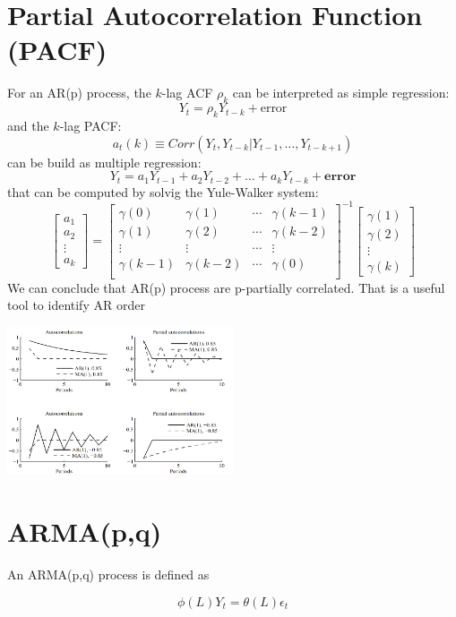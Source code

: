 \section{Partial Autocorrelation Function (PACF)}
For an AR(p) process, the $k$-lag ACF $\rho_k$ can be interpreted as simple regression:
\[
Y_t = \rho_k Y_{t-k} + \text{error}
\]
and the $k$-lag PACF:
\[
a_t(k) \equiv Corr(Y_t, Y_{t-k} | Y_{t-1}, \ldots, Y_{t-k+1})
\]
can be build as multiple regression:
\[
Y_t = a_1 Y_{t-1} + a_2 Y_{t-2} + \ldots + a_kY_{t-k} + \textbf{error}
\]
that can be computed by solvig the Yule-Walker system:
\begin{equation*}
	\begin{bmatrix}
		a_1 \\
		a_2\\
		\vdots\\
		a_k
	\end{bmatrix} =
	\begin{bmatrix}
		\gamma(0) & \gamma(1) & \cdots & \gamma(k-1) \\
		\gamma(1) & \gamma(2) & \cdots & \gamma(k-2)\\
		\vdots & \vdots & \cdots & \vdots \\
		\gamma(k-1) & \gamma(k-2) & \cdots & \gamma(0)\\
	\end{bmatrix}^{-1}
	\begin{bmatrix}
		\gamma(1) \\
		\gamma(2)\\
		\vdots\\
		\gamma(k)
	\end{bmatrix}
\end{equation*}
We can conclude that AR(p) process are p-partially correlated. That is a useful tool to identify AR order
\begin{center}
	\includegraphics[width=0.5\textwidth]{picture/(1)autocorrelation.png}
\end{center}
\section{ARMA(p,q)}
An ARMA(p,q) process is defined as
\begin{mydefinition}[ARMA]
	\begin{equation}
	\phi(L) Y_t = \theta(L) \epsilon_t
\end{equation}
\end{mydefinition}

